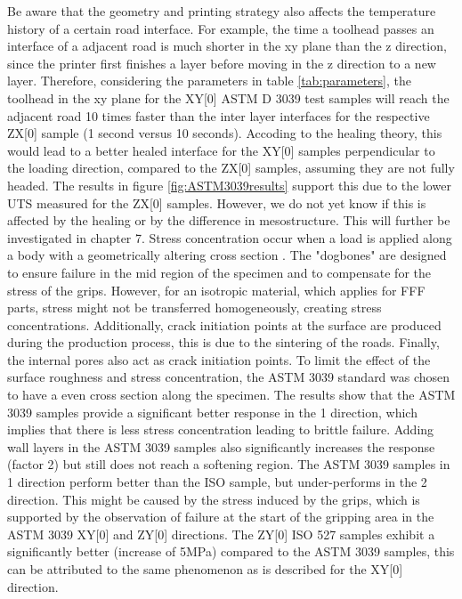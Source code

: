 Be aware that the geometry and printing strategy also affects the temperature history of a certain road interface. For example, the time a toolhead passes an interface of a adjacent road is much shorter in the xy plane than the z direction, since the printer first finishes a layer before moving in the z direction to a new layer. Therefore, considering the parameters in table \ref{tab:parameters}, the toolhead in the xy plane for the XY[0] ASTM D 3039 test samples will reach the adjacent road 10 times faster than the inter layer interfaces for the respective ZX[0] sample (1 second versus 10 seconds). Accoding to the healing theory, this would lead to a better healed interface for the XY[0] samples perpendicular to the loading direction, compared to the ZX[0] samples, assuming they are not fully headed. The results in figure \ref{fig:ASTM3039results} support this due to the lower UTS measured for the ZX[0] samples. However, we do not yet know if this is affected by the healing or by the difference in mesostructure. This will further be investigated in chapter 7. 
Stress concentration occur when a load is applied along a body with a geometrically altering cross section \cite{TronvollTheApproach}. The "dogbones" are designed to ensure failure in the mid region of the specimen and to compensate for the stress of the grips. However, for an isotropic material, which applies for FFF parts, stress might not be transferred homogeneously, creating stress concentrations. Additionally, crack initiation points at the surface are produced during the production process, this is due to the sintering of the roads. Finally, the internal pores also act as crack initiation points. To limit the effect of the surface roughness and stress concentration, the ASTM 3039 standard was chosen to have a even cross section along the specimen. The results show that the ASTM 3039 samples provide a significant better response in the 1 direction, which implies that there is less stress concentration leading to brittle failure. Adding wall layers in the ASTM 3039 samples also significantly increases the response (factor 2) but still does not reach a softening region. The ASTM 3039 samples in 1 direction perform better than the ISO sample, but under-performs in the 2 direction. This might be caused by the stress induced by the grips, which is supported by the observation of failure at the start of the gripping area in the ASTM 3039  XY[0] and ZY[0] directions. The ZY[0] ISO 527 samples exhibit a significantly better (increase of 5MPa) compared to the ASTM 3039 samples, this can be attributed to the same phenomenon as is described for the XY[0] direction.
